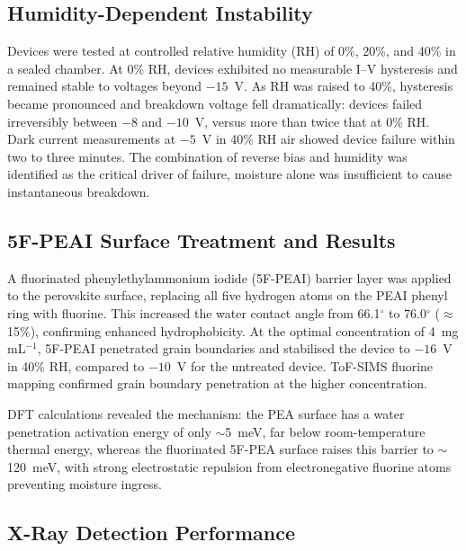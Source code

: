 \subsection{Humidity-Dependent Instability}
\label{sec:2d_humidity}

Devices were tested at controlled relative humidity (RH) of 0\%,
20\%, and 40\% in a sealed chamber.  At 0\% RH, devices exhibited
no measurable I--V hysteresis and remained stable to voltages
beyond $-15$~V.  As RH was raised to 40\%, hysteresis became
pronounced and breakdown voltage fell dramatically: devices failed
irreversibly between $-8$ and $-10$~V, versus more than twice
that at 0\% RH.  Dark current measurements at $-5$~V in 40\% RH
air showed device failure within two to three minutes.  The
combination of reverse bias and humidity was identified as the
critical driver of failure, moisture alone was insufficient to
cause instantaneous breakdown.

\subsection{5F-PEAI Surface Treatment and Results}
\label{sec:5fpeai_results}

A fluorinated phenylethylammonium iodide (5F-PEAI) barrier layer
was applied to the perovskite surface, replacing all five hydrogen
atoms on the PEAI phenyl ring with fluorine.  This increased the
water contact angle from 66.1$^\circ$ to 76.0$^\circ$
($\approx$15\%), confirming enhanced hydrophobicity.  At the
optimal concentration of 4~mg\,mL$^{-1}$, 5F-PEAI penetrated
grain boundaries and stabilised the device to $-16$~V in 40\% RH,
compared to $-10$~V for the untreated device.  ToF-SIMS
fluorine mapping confirmed grain boundary penetration at the
higher concentration.

DFT calculations revealed the mechanism: the PEA surface has a
water penetration activation energy of only $\sim$5~meV, far
below room-temperature thermal energy, whereas the fluorinated
5F-PEA surface raises this barrier to $\sim$120~meV, with strong
electrostatic repulsion from electronegative fluorine atoms
preventing moisture ingress.

\subsection{X-Ray Detection Performance}
\label{sec:2d_xray_performance}

